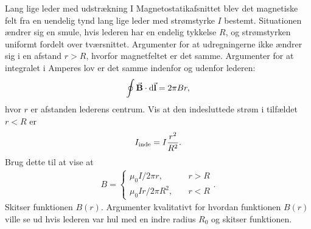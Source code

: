 \documentclass[crop=false, class=memoir]{standalone}
\begin{document}
\begin{opgave}[3]{Lang lige leder med udstrækning}
    I Magnetostatikafsnittet blev det magnetiske felt fra en uendelig tynd lang lige leder med strømstyrke $I$ bestemt. Situationen ændrer sig en smule, hvis lederen har en endelig tykkelse $R$, og strømstyrken uniformt fordelt over tværsnittet.
    \opg Argumenter for at udregningerne ikke ændrer sig i en afstand $r>R$, hvorfor magnetfeltet er det samme.
    \opg Argumenter for at integralet i Amperes lov er det samme indenfor og udenfor lederen:
    \begin{align}
        \oint \va B \cdot \dd \va l = 2\pi B r,
    \end{align}
    hvor $r$ er afstanden lederens centrum.
    \opg Vis at den indesluttede strøm i tilfældet $r<R$ er
    \begin{align}
        I_\textup{inde} = I \frac{r^2}{R^2}.
    \end{align}
    \opg Brug dette til at vise at
    \begin{align}
        B = \begin{cases}
            \mu_0I/2\pi r, \quad &r>R \\
            \mu_0Ir/2\pi R^2, \quad &r<R
        \end{cases}
        .
    \end{align}
    \opg Skitser funktionen $B(r)$.
    \opg Argumenter kvalitativt for hvordan funktionen $B(r)$ ville se ud hvis lederen var hul med en indre radius $R_0$ og skitser funktionen.
\end{opgave}
\end{document}
